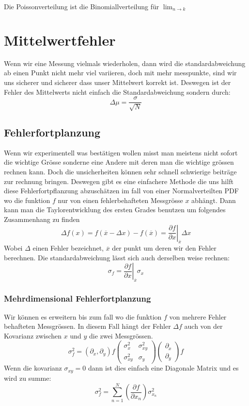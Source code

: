 \documentclass{article}
\begin{document}
Die Poissonverteilung ist die Binomiallverteilung für $\lim_{n\rightarrow k}$
\hypertarget{mittelwertfehler}{\section*{Mittelwertfehler}}
Wenn wir eine Messung vielmals wiederholen, dann wird die standardabweichung ab einen Punkt nicht mehr viel variieren, doch mit mehr messpunkte, sind wir uns sicherer und sicherer dass unser Mittelwert korrekt ist. Deswegen ist der Fehler des Mittelwerts nicht einfach die Standardabweichung sondern durch:
\[\Delta \mu=\frac{\sigma}{\sqrt{N}}\]
\hypertarget{fehlerfortplanzung}{\subsection*{Fehlerfortplanzung}}
Wenn wir experimentell was bestätigen wollen misst man meistens nicht sofort die wichtige Grösse sonderne eine Andere mit
deren man die wichtige grössen rechnen kann. Doch die unsicherheiten können sehr schnell schwierige beiträge zur rechnung bringen.
Deswegen gibt es eine einfachere Methode die uns hilft diese Fehlerfortpflanzung abzuschätzen im fall von einer Normalverteilten PDF
wo die funktion $f$ nur von einen fehlerbehafteten Messgrösse $x$ abhängt. 
Dann kann man die Taylorentwicklung des ersten Grades benutzen um folgendes Zusammenhang zu finden
\[\Delta f(x)=f(\overline{x}-\Delta x)-f(\overline{x})=\left.\frac{\partial f}{\partial x}\right|_{\overline{x}}\Delta x\]
Wobei $\Delta$ einen Fehler bezeichnet, $\overline{x}$ der punkt um deren wir den Fehler berechnen. Die standardabweichung lässt sich auch derselben weise rechnen:
\[\sigma_f=\left.\frac{\partial f}{\partial x}\right|_ {\overline{x}}\sigma_x\]
\hypertarget{mehrdimensionaleFehlerfortpflanzung}{\subsubsection*{Mehrdimensional Fehlerfortplanzung}}
Wir können es erweitern bis zum fall wo die funktion $f$ von mehrere Fehler behafteten Messgrössen. In diesem Fall hängt der
Fehler $\Delta f$ auch von der Kovarianz zwischen $x$ und $y$ die zwei Messgrössen.
\[\sigma_f^2=(\partial_x,\partial_y)f\begin{pmatrix}\sigma_x^2&\sigma_{xy}^2\\\sigma_{xy}^2&\sigma_y\end{pmatrix}\begin{pmatrix}\partial_x\\\partial_y\end{pmatrix}f\]
Wenn die kovarianz $\sigma_{xy}=0$ dann ist dies einfach eine Diagonale Matrix und es wird zu summe:
\[\sigma_f^2=\sum_{n=1}^N\left(\frac{\partial f}{\partial x_n}\right)\sigma_{x_n}^2\]
\end{document}

